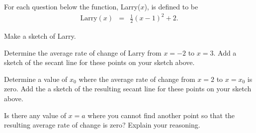 \begin{problem}
  \clearpage

\item For each question below the function, Larry($x$), is defined to be
  \begin{eqnarray*}
    \mathrm{Larry}(x) & = & \frac{1}{2} (x-1)^2+2.
  \end{eqnarray*}
  \begin{subproblem}
  \item Make a sketch of Larry.


  \item Determine the average rate of change of Larry from $x=-2$ to
    $x=3$. Add a sketch of the secant line for these points on your
    sketch above.

    \vfill

  \item Determine a value of $x_0$ where the average rate of change
    from $x=2$ to $x=x_0$ is zero. Add the a sketch of the resulting
    secant line for these points on your sketch above.

    \vfill

  \item Is there any value of $x=a$ where you cannot find another
    point so that the resulting average rate of change is zero?
    Explain your reasoning.

    \vspace{2em}


  \end{subproblem}

\end{problem}

